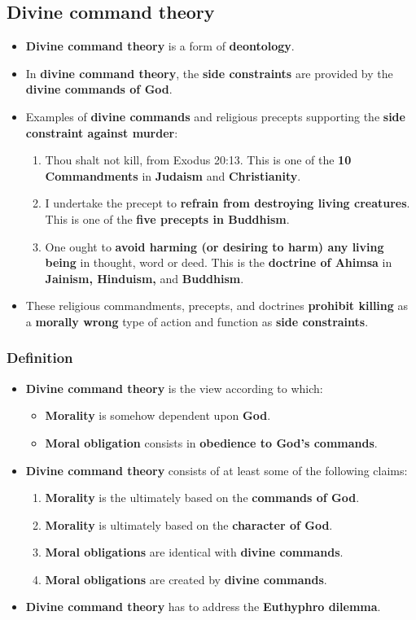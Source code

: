 \documentclass[11pt]{article}
\begin{document}
\subsection{Divine command theory}
\label{sec:org17b68fa}
\begin{itemize}
\item \textbf{Divine command theory} is a form of \textbf{deontology}.
\item In \textbf{divine command theory}, the \textbf{side constraints} are provided by the \textbf{divine commands of God}.
\item Examples of \textbf{divine commands} and religious precepts supporting the \textbf{side constraint against murder}:
\begin{enumerate}
\item Thou shalt not kill, from Exodus 20:13. This is one of the \textbf{10 Commandments} in \textbf{Judaism} and \textbf{Christianity}.
\item I undertake the precept to \textbf{refrain from destroying living creatures}. This is one of the \textbf{five precepts in Buddhism}.
\item One ought to \textbf{avoid harming (or desiring to harm) any living being} in thought, word or deed. This is the \textbf{doctrine of Ahimsa} in \textbf{Jainism, Hinduism,} and \textbf{Buddhism}.
\end{enumerate}
\item These religious commandments, precepts, and doctrines \textbf{prohibit killing} as a \textbf{morally wrong} type of action and function as \textbf{side constraints}.
\end{itemize}
\subsubsection{Definition}
\label{sec:org11828cd}
\begin{itemize}
\item \textbf{Divine command theory} is the view according to which:
\begin{itemize}
\item \textbf{Morality} is somehow dependent upon \textbf{God}.
\item \textbf{Moral obligation} consists in \textbf{obedience to God's commands}.
\end{itemize}
\item \textbf{Divine command theory} consists of at least some of the following claims:
\begin{enumerate}
\item \textbf{Morality} is the ultimately based on the \textbf{commands of God}.
\item \textbf{Morality} is ultimately based on the \textbf{character of God}.
\item \textbf{Moral obligations} are identical with \textbf{divine commands}.
\item \textbf{Moral obligations} are created by \textbf{divine commands}.
\end{enumerate}
\item \textbf{Divine command theory} has to address the \textbf{Euthyphro dilemma}.
\end{itemize}
\end{document}
